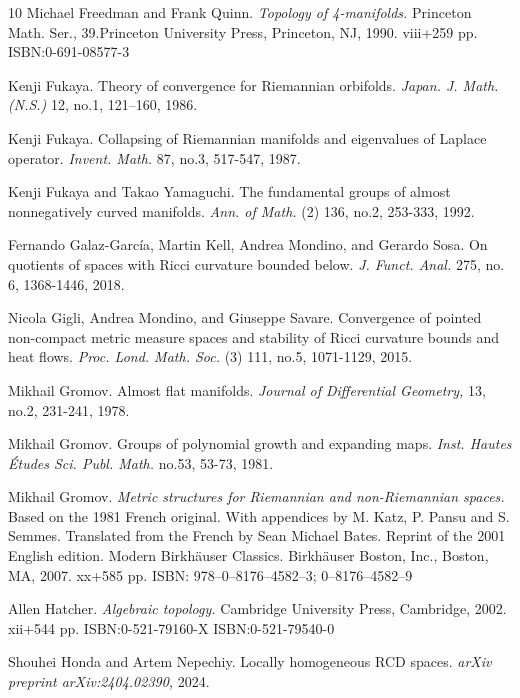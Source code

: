 \documentclass[12pt]{amsart}
\theoremstyle{definition}
\numberwithin{equation}{section}
\begin{document}
\begin{thebibliography}{10}
Michael Freedman and Frank Quinn.  
{\em Topology of 4-manifolds.} Princeton Math. Ser., 39.Princeton University Press, Princeton, NJ, 1990. viii+259 pp. ISBN:0-691-08577-3

Kenji Fukaya. 
\newblock Theory of convergence for Riemannian orbifolds.  {\em Japan. J. Math. (N.S.) } 12, no.1, 121–160, 1986.

Kenji Fukaya.  
\newblock Collapsing of Riemannian manifolds and eigenvalues of Laplace operator. {\em Invent. Math.}  87, no.3, 517-547, 1987.

Kenji Fukaya and Takao  Yamaguchi.
\newblock The fundamental groups of almost nonnegatively curved manifolds. {\em Ann. of Math. }(2) 136, no.2, 253-333, 1992.


Fernando Galaz-Garc\'ia, Martin Kell, Andrea  Mondino, and Gerardo Sosa.
\newblock On quotients of spaces with Ricci curvature bounded below. {\em J. Funct. Anal. } 275, no. 6, 1368-1446, 2018.


Nicola Gigli, Andrea Mondino, and Giuseppe Savare.
\newblock Convergence of pointed non-compact metric measure spaces and stability of Ricci curvature bounds and heat flows. {\em Proc. Lond. Math. Soc. }(3) 111, no.5, 1071-1129, 2015.

Mikhail Gromov.
\newblock Almost flat manifolds. {\em Journal of Differential Geometry, }13, no.2, 231-241, 1978.

Mikhail Gromov.
\newblock Groups of polynomial growth and expanding maps. {\em Inst. Hautes \'Etudes Sci. Publ. Math. }no.53, 53-73, 1981.


Mikhail Gromov. {\em Metric structures for Riemannian and non-Riemannian spaces. } Based on the 1981 French original. With appendices by M. Katz, P. Pansu and S. Semmes. Translated from the French by Sean Michael Bates. Reprint of the 2001 English edition. Modern Birkh\"auser Classics. Birkh\"auser Boston, Inc., Boston, MA, 2007. xx+585 pp. ISBN: 978--0--8176--4582--3; 0--8176--4582--9

 
Allen Hatcher.  
{\em Algebraic topology. } 
Cambridge University Press, Cambridge, 2002. xii+544 pp.
ISBN:0-521-79160-X 
ISBN:0-521-79540-0

Shouhei Honda and  Artem Nepechiy.
\newblock Locally homogeneous RCD spaces. {\em arXiv preprint arXiv:2404.02390,} 2024. 


\end{thebibliography}
\end{document}
